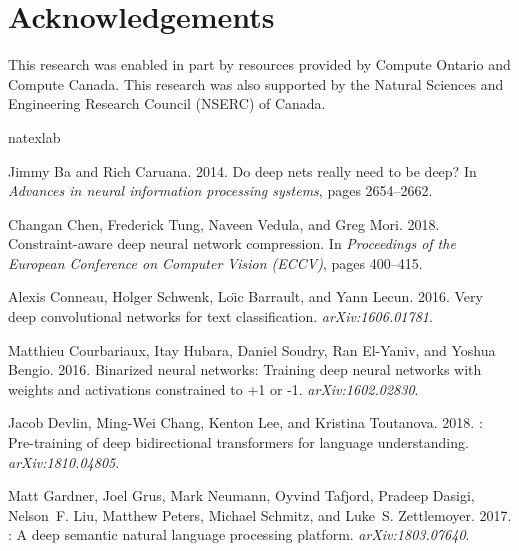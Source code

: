 \documentclass[11pt,a4paper]{article}
\begin{document}
\section*{Acknowledgements}
This research was enabled in part by resources provided by Compute Ontario and Compute Canada. This research was also supported by the Natural Sciences and Engineering Research Council (NSERC) of Canada.





\begin{thebibliography}{40}
\expandafter\ifx\csname natexlab\endcsname\relax\def\natexlab#1{#1}\fi

Jimmy Ba and Rich Caruana. 2014.
\newblock Do deep nets really need to be deep?
\newblock In \emph{Advances in neural information processing systems}, pages
  2654--2662.

Changan Chen, Frederick Tung, Naveen Vedula, and Greg Mori. 2018.
\newblock Constraint-aware deep neural network compression.
\newblock In \emph{Proceedings of the European Conference on Computer Vision
  (ECCV)}, pages 400--415.

Alexis Conneau, Holger Schwenk, Lo{\"\i}c Barrault, and Yann Lecun. 2016.
\newblock Very deep convolutional networks for text classification.
\newblock \emph{arXiv:1606.01781}.

Matthieu Courbariaux, Itay Hubara, Daniel Soudry, Ran El-Yaniv, and Yoshua
  Bengio. 2016.
\newblock Binarized neural networks: Training deep neural networks with weights
  and activations constrained to +1 or -1.
\newblock \emph{arXiv:1602.02830}.

Jacob Devlin, Ming-Wei Chang, Kenton Lee, and Kristina Toutanova. 2018.
: Pre-training of deep bidirectional transformers for language
  understanding.
\newblock \emph{arXiv:1810.04805}.

Matt Gardner, Joel Grus, Mark Neumann, Oyvind Tafjord, Pradeep Dasigi,
  Nelson~F. Liu, Matthew Peters, Michael Schmitz, and Luke~S. Zettlemoyer.
  2017.
: A deep semantic natural language processing platform.
\newblock \emph{arXiv:1803.07640}.


\end{thebibliography}
\end{document}

